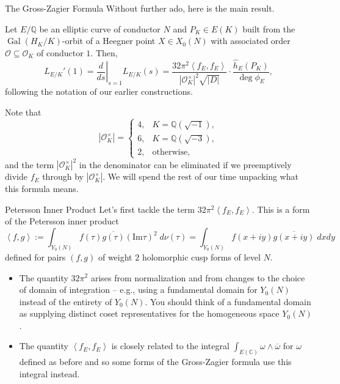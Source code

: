 \documentclass[aspectratio=1610]{beamer}
\renewcommand{\O}{\mathcal{O}}
\renewcommand{\subset}{\subseteq}
\renewcommand{\Im}{\textrm{Im}}
\newcommand{\C}{\mathbb{C}}
\newcommand{\Q}{\mathbb{Q}}
\newcommand{\df}{\dfrac}
\newcommand{\ip}[1]{\left\langle#1\right\rangle}
\newcommand{\ov}{\overline}
\DeclareMathOperator{\Gal}{Gal}
\begin{document}
\begin{frame}{The Gross-Zagier Formula}
Without further ado, here is the main result.
\begin{theorem}
Let $E/\Q$ be an elliptic curve of conductor $N$ and $P_K\in E(K)$ built from the $\Gal(H_K/K)$-orbit of a Heegner point $X\in X_0(N)$ with associated order $\O\subset\O_K$ of conductor $1$. Then,
$$L_{E/K}'(1)=\left.\df{d}{ds}\right\vert_{s=1}L_{E/K}(s)=\df{32\pi^2\ip{f_E,f_E}}{|\O_K^{\times}|^2\sqrt{|D|}}\cdot\df{\hat{h}_E(P_K)}{\deg\phi_E},$$
following the notation of our earlier constructions.
\end{theorem}
Note that
\begin{equation*}
|\O_K^{\times}|=
\begin{cases}
4, & K=\Q(\sqrt{-1}), \\
6, & K=\Q(\sqrt{-3}), \\
2, & \textrm{otherwise},
\end{cases}
\end{equation*}
and the term $|\O_K^{\times}|^2$ in the denominator can be eliminated if we preemptively divide $f_E$ through by $|\O_K^{\times}|$. We will spend the rest of our time unpacking what this formula means. 
\end{frame}

\begin{frame}{Petersson Inner Product}
Let's first tackle the term $32\pi^2\ip{f_E,f_E}$. This is a form of the Petersson inner product
$$\ip{f,g}:=\int_{Y_0(N)}f(\tau)\ov{g(\tau)}(\Im\tau)^2\;d\nu(\tau)=\int_{Y_0(N)}f(x+iy)\ov{g(x+iy)}\;dxdy$$
defined for pairs $(f,g)$ of weight $2$ holomorphic cusp forms of level $N$. 
\begin{itemize}
\item The quantity $32\pi^2$ arises from normalization and from changes to the choice of domain of integration -- e.g., using a fundamental domain for $Y_0(N)$ instead of the entirety of $Y_0(N)$. You should think of a fundamental domain as supplying distinct coset representatives for the homogeneous space $Y_0(N)$.

\item The quantity $\ip{f_E,f_E}$ is closely related to the integral $\int_{E(\C)}\omega\wedge\ov{\omega}$ for $\omega$ defined as before and so some forms of the Gross-Zagier formula use this integral instead.
\end{itemize}
\end{frame}
\end{document}
